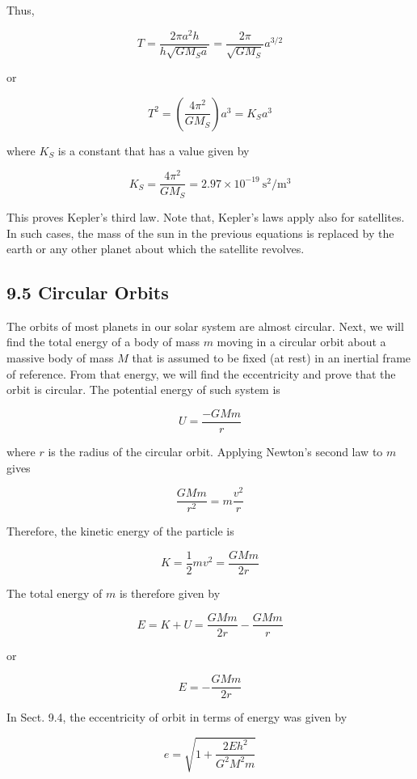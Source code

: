 \documentclass[10pt]{article}
\begin{document}
Thus,

$$
T=\frac{2 \pi a^{2} h}{h \sqrt{G M_{S} a}}=\frac{2 \pi}{\sqrt{G M_{S}}} a^{3 / 2}
$$

or

$$
T^{2}=\left(\frac{4 \pi^{2}}{G M_{S}}\right) a^{3}=K_{S} a^{3}
$$

where $K_{S}$ is a constant that has a value given by

$$
K_{S}=\frac{4 \pi^{2}}{G M_{S}}=2.97 \times 10^{-19} \mathrm{~s}^{2} / \mathrm{m}^{3}
$$

This proves Kepler's third law. Note that, Kepler's laws apply also for satellites. In such cases, the mass of the sun in the previous equations is replaced by the earth or any other planet about which the satellite revolves.

\subsection*{9.5 Circular Orbits}
The orbits of most planets in our solar system are almost circular. Next, we will find the total energy of a body of mass $m$ moving in a circular orbit about a massive body of mass $M$ that is assumed to be fixed (at rest) in an inertial frame of reference. From that energy, we will find the eccentricity and prove that the orbit is circular. The potential energy of such system is

$$
U=\frac{-G M m}{r}
$$

where $r$ is the radius of the circular orbit. Applying Newton's second law to $m$ gives


\begin{equation*}
\frac{G M m}{r^{2}}=m \frac{v^{2}}{r} \tag{9.31}
\end{equation*}


Therefore, the kinetic energy of the particle is

$$
K=\frac{1}{2} m v^{2}=\frac{G M m}{2 r}
$$

The total energy of $m$ is therefore given by

$$
E=K+U=\frac{G M m}{2 r}-\frac{G M m}{r}
$$

or


\begin{equation*}
E=-\frac{G M m}{2 r} \tag{9.32}
\end{equation*}


In Sect. 9.4, the eccentricity of orbit in terms of energy was given by


\begin{equation*}
e=\sqrt{1+\frac{2 E h^{2}}{G^{2} M^{2} m}} \tag{9.33}
\end{equation*}
\end{document}
